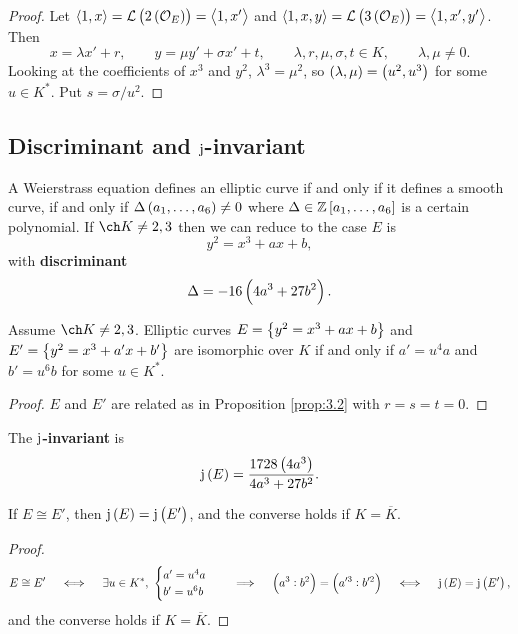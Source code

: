 \begin{proof}
Let $ \abr{1, x} = \LLL\br{2\br{\OOO_E}} = \abr{1, x'} $ and $ \abr{1, x, y} = \LLL\br{3\br{\OOO_E}} = \abr{1, x', y'} $. Then
$$ x = \lambda x' + r, \qquad y = \mu y' + \sigma x' + t, \qquad \lambda, r, \mu, \sigma, t \in K, \qquad \lambda, \mu \ne 0. $$
Looking at the coefficients of $ x^3 $ and $ y^2 $, $ \lambda^3 = \mu^2 $, so $ \br{\lambda, \mu} = \br{u^2, u^3} $ for some $ u \in K^* $. Put $ s = \sigma / u^2 $.
\end{proof}

\pagebreak

\subsection{Discriminant and \texorpdfstring{$ \mathrm{j} $}{j}-invariant}

A Weierstrass equation defines an elliptic curve if and only if it defines a smooth curve, if and only if $ \Delta\br{a_1, \dots, a_6} \ne 0 $ where $ \Delta \in \ZZ\sbr{a_1, \dots, a_6} $ is a certain polynomial. If $ \ch K \ne 2, 3 $ then we can reduce to the case $ E $ is
$$ y^2 = x^3 + ax + b, $$
with \textbf{discriminant}
$$ \Delta = -16\br{4a^3 + 27b^2}. $$

\begin{corollary}
Assume $ \ch K \ne 2, 3 $. Elliptic curves $ E = \cbr{y^2 = x^3 + ax + b} $ and $ E' = \cbr{y^2 = x^3 + a'x + b'} $ are isomorphic over $ K $ if and only if $ a' = u^4a $ and $ b' = u^6b $ for some $ u \in K^* $.
\end{corollary}

\begin{proof}
$ E $ and $ E' $ are related as in Proposition \ref{prop:3.2} with $ r = s = t = 0 $.
\end{proof}

\begin{definition*}
The \textbf{$ \mathrm{j} $-invariant} is
$$ \j\br{E} = \dfrac{1728\br{4a^3}}{4a^3 + 27b^2}. $$
\end{definition*}

\begin{corollary}
If $ E \cong E' $, then $ \j\br{E} = \j\br{E'} $, and the converse holds if $ K = \overline{K} $.
\end{corollary}

\begin{proof}
$$ E \cong E' \quad \iff \quad \exists u \in K^*, \
\begin{cases}
a' = u^4a \\
b' = u^6b
\end{cases}
\quad \implies \quad \br{a^3 : b^2} = \br{a'^3 : b'^2} \quad \iff \quad \j\br{E} = \j\br{E'}, $$
and the converse holds if $ K = \overline{K} $.
\end{proof}

